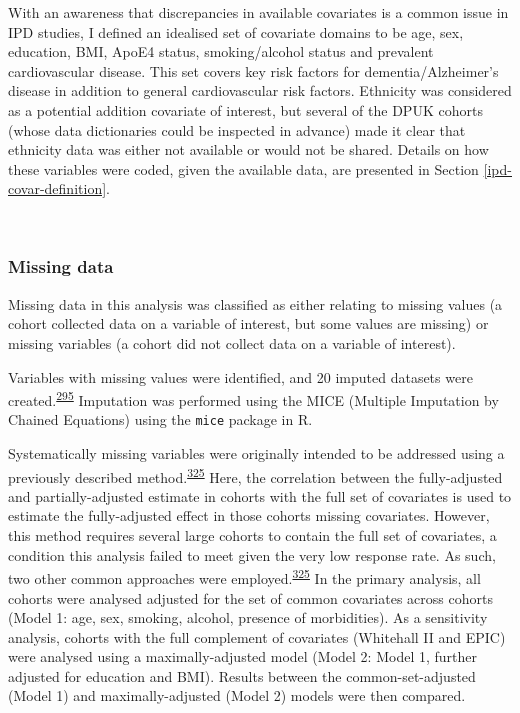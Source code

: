 \documentclass[a4paper, twoside]{templates/ociamthesis}
\begin{document}
With an awareness that discrepancies in available covariates is a common issue in IPD studies, I defined an idealised set of covariate domains to be age, sex, education, BMI, ApoE4 status, smoking/alcohol status and prevalent cardiovascular disease. This set covers key risk factors for dementia/Alzheimer's disease in addition to general cardiovascular risk factors. Ethnicity was considered as a potential addition covariate of interest, but several of the DPUK cohorts (whose data dictionaries could be inspected in advance) made it clear that ethnicity data was either not available or would not be shared. Details on how these variables were coded, given the available data, are presented in Section \ref{ipd-covar-definition}.

~

\hypertarget{missing-data-2}{%
\subsubsection{Missing data}\label{missing-data-2}}

Missing data in this analysis was classified as either relating to missing values (a cohort collected data on a variable of interest, but some values are missing) or missing variables (a cohort did not collect data on a variable of interest).

Variables with missing values were identified, and 20 imputed datasets were created.\textsuperscript{\protect\hyperlink{ref-sterne2009}{295}} Imputation was performed using the MICE (Multiple Imputation by Chained Equations) using the \texttt{mice} package in R.

Systematically missing variables were originally intended to be addressed using a previously described method.\textsuperscript{\protect\hyperlink{ref-fibrinogenstudiescollaboration2009}{325}} Here, the correlation between the fully-adjusted and partially-adjusted estimate in cohorts with the full set of covariates is used to estimate the fully-adjusted effect in those cohorts missing covariates. However, this method requires several large cohorts to contain the full set of covariates, a condition this analysis failed to meet given the very low response rate. As such, two other common approaches were employed.\textsuperscript{\protect\hyperlink{ref-fibrinogenstudiescollaboration2009}{325}} In the primary analysis, all cohorts were analysed adjusted for the set of common covariates across cohorts (Model 1: age, sex, smoking, alcohol, presence of morbidities). As a sensitivity analysis, cohorts with the full complement of covariates (Whitehall II and EPIC) were analysed using a maximally-adjusted model (Model 2: Model 1, further adjusted for education and BMI). Results between the common-set-adjusted (Model 1) and maximally-adjusted (Model 2) models were then compared.
\end{document}
